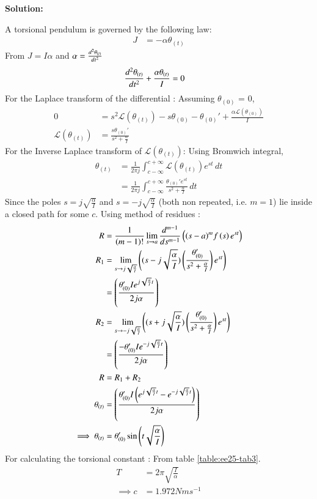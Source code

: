 \documentclass[journal,12pt,onecolumn]{IEEEtran}
\theoremstyle{remark}
\begin{document}
\textbf{Solution:}
    
A torsional pendulum is governed by the following law:
\begin{align}
    J &= -\alpha\theta_{(t)} 
\end{align}
From $J = I\alpha$ and $\alpha = \dv[2]{\theta_{(t)}}{t}$
\begin{align}
\dv[2]{\theta_{(t)}}{t} + \frac{\alpha\theta_{(t)}}{I} &= 0
\end{align}
For the Laplace transform of the differential : 
Assuming $\theta_{(0)}$ = 0,
\begin{align}
0 &= s^2\mathscr{L}(\theta_{(t)}) - s\theta_{(0)} - \theta_{(0)}' + \frac{\alpha\mathscr{L}(\theta_{(0)})}{I}\\
\mathscr{L}(\theta_{(t)}) &= \frac{s\theta_{(0)}'}{s^2+\frac{\alpha}{I}}
    \end{align}
For the Inverse Laplace transform of $\mathscr{L}(\theta_{(t)})$: Using Bromwich integral,
\begin{align}
 \theta_{(t)} &= \frac{1}{2\pi j}\int_{c-\infty}^{c+\infty}\mathscr{L}(\theta_{(t)})e^{st}\,dt\\
 &= \frac{1}{2\pi j}\int_{c-\infty}^{c+\infty}\frac{\theta_{(0)}'e^{st}}{s^2+\frac{\alpha}{I}}\,dt
\end{align}
Since the poles $s=j\sqrt{\frac{\alpha}{I}}$ and $s=-j\sqrt{\frac{\alpha}{I}}$ (both non repeated, i.e. $m=1$) lie inside a closed path for some $c$. Using method of residues :
\begin{align}
    R&=\frac{1}{\left(m-1\right)!}\lim\limits_{s\to a}\frac{d^{m-1}}{ds^{m-1}}\left({(s-a)}^{m}f\left(s\right) e^{st}\right)\\
      R_1&=\lim\limits_{s\to j\sqrt{\frac{\alpha}{I}}}\left({(s-j\sqrt{\frac{\alpha}{I}})}\left(\frac{\theta_{(0)}'}{s^2+\frac{\alpha}{I}}\right) e^{st}\right)\\
&={\left(\frac{\theta_{(0)}'Ie^{j\sqrt{\frac{\alpha}{I}}t}}{2j\alpha}\right)}\\
  R_2&=\lim\limits_{s\to -j\sqrt{\frac{\alpha}{I}}}\left({(s+j\sqrt{\frac{\alpha}{I}})}\left(\frac{\theta_{(0)}'}{s^2+\frac{\alpha}{I}}\right) e^{st}\right)\\
&={\left(\frac{-\theta_{(0)}'Ie^{-j\sqrt{\frac{\alpha}{I}}t}}{2j\alpha}\right)}\\
R &= R_1 + R_2\\
\theta_{(t)} &= {\left(\frac{\theta_{(0)}'I\left(e^{j\sqrt{\frac{\alpha}{I}}t}-e^{-j\sqrt{\frac{\alpha}{I}}t}\right)}{2j\alpha}\right)}\\
\implies
\theta_{(t)} &=\theta_{(0)}'\sin{\ensuremath{\left(t\sqrt{\frac{\alpha}{I}}\right)}}
\end{align}
For calculating the torsional constant :
From table \ref{table:ee25-tab3}.
\begin{align}
 T &= 2\pi\sqrt{\frac{I}{\alpha}}\\
\implies c &= 1.972 Nms^{-1}
\end{align}
\end{document}
